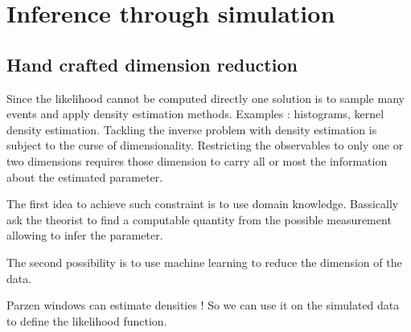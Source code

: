 \section{Inference through simulation} %
\label{sec:inference_through_simulation}













\subsection{Hand crafted dimension reduction} %
\label{sub:hand_crafted_dimension_reduction}

Since the likelihood cannot be computed directly one solution is to sample many events and apply density estimation methods.
Examples : histograms, kernel density estimation.
Tackling the inverse problem with density estimation is subject to the curse of dimensionality.
Restricting the observables to only one or two dimensions requires those dimension to carry all or most the information about the estimated parameter.

The first idea to achieve such constraint is to use domain knowledge.
Bassically ask the theorist to find a computable quantity from the possible measurement allowing to infer the parameter.


The second possibility is to use machine learning to reduce the dimension of the data.


Parzen windows can estimate densities !
So we can use it on the simulated data to define the likelihood function.






